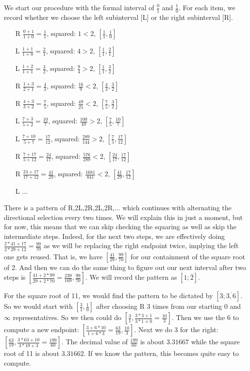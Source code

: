 \documentclass[12pt]{article}
\begin{document}
We start our procedure with the formal interval of $\tfrac{0}{1}$ and $\tfrac{1}{0}$. For each item, we record whether we choose the left subinterval [L] or the right subinterval [R]. 


\begin{itemize}
    \item[R] $\tfrac{0+1}{1+0} = \tfrac{1}{1}$, squared: $1 < 2$,  $[\tfrac{1}{1},\tfrac{1}{0}] $
    \item[L] $\tfrac{1+1}{1+0} = \tfrac{2}{1}$, squared: $4 > 2$, $[\tfrac{1}{1},\tfrac{2}{1}]$
    \item[L] $\tfrac{1+2}{1+1} = \tfrac{3}{2}$, squared: $\tfrac{9}{4} > 2$, $[\tfrac{1}{1},\tfrac{3}{2}]$
    \item[R] $\tfrac{1+3}{2+1} = \tfrac{4}{3}$, squared: $\tfrac{16}{9} < 2$, $[\tfrac{4}{3},\tfrac{3}{2}]$
    \item[R] $\tfrac{4+3}{3+2} = \tfrac{7}{5}$, squared: $\tfrac{49}{25} < 2$, 
    $[\tfrac{7}{5},\tfrac{3}{2}]$
    \item[L] $\tfrac{7+3}{5+2} = \tfrac{10}{7}$, squared: $\tfrac{100}{49} > 2$, 
    $[\tfrac{7}{5},\tfrac{10}{7}]$
    \item[L] $\tfrac{7+10}{5+7} = \tfrac{17}{12}$, squared: $\tfrac{289}{144} > 2$, 
    $[\tfrac{7}{5},\tfrac{17}{12}]$
    \item[R] $\tfrac{7+17}{5+12} = \tfrac{24}{17}$, squared: $\tfrac{576}{289} < 2$, 
    $[\tfrac{24}{17},\tfrac{17}{12}]$
    \item[R] $\tfrac{24+17}{17+12} = \tfrac{41}{29}$, squared: $\tfrac{1681}{841} < 2$, 
    $[\tfrac{41}{29},\tfrac{17}{12}]$
    \item[L] $\ldots$
\end{itemize}

There is a pattern of R,2L,2R,2L,2R,$\ldots$ which continues with alternating the directional selection every two times. We will explain this in just a moment, but for now, this means that we can skip checking the squaring as well as skip the intermediate steps. Indeed, for the next two steps, we are effectively doing $\tfrac{2*41 + 17}{2*29 + 12} = \tfrac{99}{70}$ as we will be replacing the right endpoint twice, implying the left one gets reused. That is, we have $[\tfrac{41}{29}, \tfrac{99}{70}]$ for our containment of the square root of 2. And then we can do the same thing to figure out our next interval after two steps is $[\tfrac{41+2*99}{29+2*70}=\tfrac{239}{169}, \tfrac{99}{70}]$. We will record the pattern as $[1; \bar{2}]$.

For the square root of 11, we would find the pattern to be dictated by $[3;\overline{3,6}]$. So we would start with $[\tfrac{3}{1}, \tfrac{1}{0}]$ after choosing R 3 times from our starting 0 and $\infty$ representatives. So we then could do $[\tfrac{3}{1}, \tfrac{3*3 + 1}{3*1 + 0} = \tfrac{10}{3}]$. Then we use the 6 to compute a new endpoint:  $[\tfrac{3+6*10}{1+6*3} = \tfrac{63}{19}, \tfrac{10}{3}]$. Next we do 3 for the right:  $[\tfrac{63}{19}, \tfrac{3*63+10}{3*19+3} = \tfrac{199}{60}]$. The decimal value of $\tfrac{199}{60}$ is about $3.31667$ while the square root of 11 is about $3.31662$. If we know the pattern, this becomes quite easy to compute. 
\end{document}
